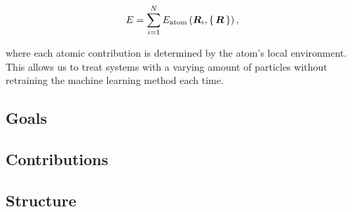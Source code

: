 \begin{equation}
E = \sum_{i=1}^N E_{\text{atom}}\left(\bm{R}_i, \set{\bm{R}} \right) ,
\end{equation}

where each atomic contribution is determined by the atom's
local environment. This allows us to treat systems with
a varying amount of particles without retraining
the machine learning method each time.

\subsection{Goals}

\subsection{Contributions}

\subsection{Structure}
